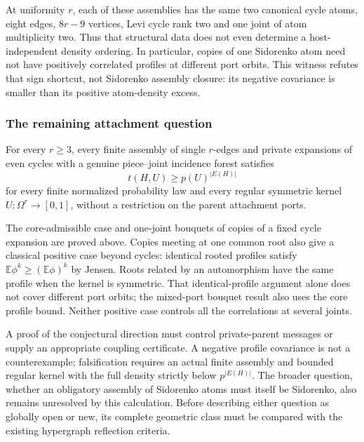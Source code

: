 At uniformity $r$, each of these assemblies has the same two canonical
cycle atoms, eight edges, $8r-9$ vertices, Levi cycle rank two and one joint of
atom multiplicity two.  Thus that structural data does not even
determine a host-independent density ordering.  In particular,
copies of one Sidorenko atom need not have positively correlated
profiles at different port orbits.  This witness refutes that sign
shortcut, not Sidorenko assembly closure: its negative covariance
is smaller than its positive atom-density excess.

\subsubsection{The remaining attachment question}

\begin{conjecture}
\label{followon-regular-cycle-assembly-question}
For every $r\ge3$, every finite assembly of single $r$-edges and
private expansions of even cycles with a genuine piece--joint
incidence forest satisfies
\[
 t(H,U)\ge p(U)^{|E(H)|}
\]
for every finite normalized probability law and every regular
symmetric kernel $U:\Omega^r\to[0,1]$, without a restriction on
the parent attachment ports.
\end{conjecture}

The core-admissible case and one-joint bouquets of copies of a fixed
cycle expansion are proved above.  Copies meeting at one
common root also give a classical positive case beyond cycles:
identical rooted profiles satisfy $\mathbb E\phi^k\ge(\mathbb E\phi)^k$ by Jensen.
Roots related by an automorphism have the same profile when the
kernel is symmetric.  That identical-profile argument alone does
not cover different port orbits; the mixed-port bouquet result also
uses the core profile bound.  Neither positive case controls all
the correlations at several joints.

A proof of the conjectural direction must control private-parent
messages or supply an appropriate coupling certificate.  A negative
profile covariance is not a counterexample; falsification requires an
actual finite assembly and bounded regular kernel with the full
density strictly below $p^{|E(H)|}$.  The broader question, whether
an obligatory assembly of Sidorenko atoms must itself be Sidorenko,
also remains unresolved by this calculation.  Before describing either
question as globally open or new, its complete geometric class must
be compared with the existing hypergraph reflection criteria.

